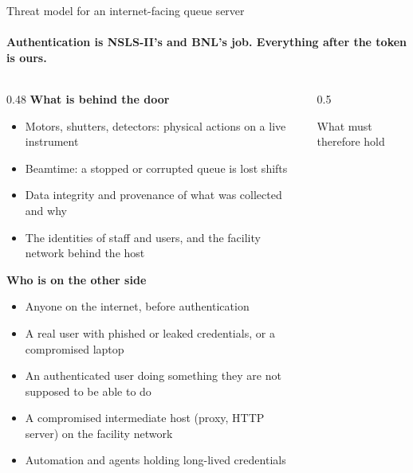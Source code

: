 

\begin{frame}{Threat model for an internet-facing queue server}
    \framesubtitle{Authentication is NSLS-II's and BNL's job. Everything after the token is ours.}
    \begin{columns}[T]
        \begin{column}{0.48\textwidth}
            \scriptsize
            \textbf{What is behind the door}
            \begin{itemize}
                \item Motors, shutters, detectors: physical actions on a live instrument
                \item Beamtime: a stopped or corrupted queue is lost shifts
                \item Data integrity and provenance of what was collected and why
                \item The identities of staff and users, and the facility network behind the host
            \end{itemize}
            \vspace{0.15cm}
            \textbf{Who is on the other side}
            \begin{itemize}
                \item Anyone on the internet, before authentication
                \item A real user with phished or leaked credentials, or a compromised laptop
                \item An authenticated user doing something they are not supposed to be able to do
                \item A compromised intermediate host (proxy, HTTP server) on the facility network
                \item Automation and agents holding long-lived credentials
            \end{itemize}
        \end{column}
        \begin{column}{0.5\textwidth}
            \begin{block}{What must therefore hold}
                \scriptsize

\end{block}
\end{column}
\end{columns}
\end{frame}
